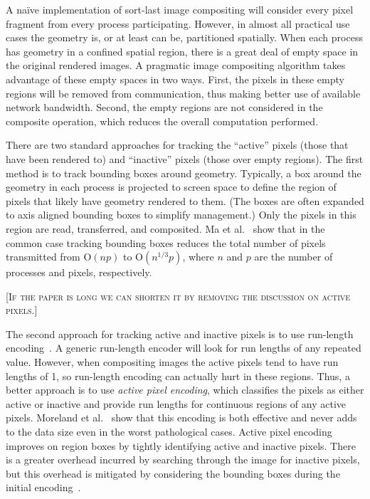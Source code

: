 \documentclass{vgtc}                          %
\newcommand*{\lcite}[1]{~\cite{#1}}
\newcommand*{\scite}[1]{~\cite{#1}}
\newcommand{\etal}{et al.}
\newcommand*{\keyterm}[1]{\emph{#1}}
\newcommand{\Oh}{\mathrm{O}}
\newcommand{\sticky}[1]{{\color{red}\textsc{[#1]}}}
\begin{document}
A na\"{i}ve implementation of sort-last image compositing will consider
every pixel fragment from every process participating.  However, in almost
all practical use cases the geometry is, or at least can be, partitioned
spatially.  When each process has geometry in a confined spatial region,
there is a great deal of empty space in the original rendered images.  A
pragmatic image compositing algorithm takes advantage of these empty spaces
in two ways.  First, the pixels in these empty regions will be removed from
communication, thus making better use of available network bandwidth.
Second, the empty regions are not considered in the composite operation,
which reduces the overall computation performed.

There are two standard approaches for tracking the ``active'' pixels (those
that have been rendered to) and ``inactive'' pixels (those over empty
regions).  The first method is to track bounding boxes around geometry.
Typically, a box around the geometry in each process is projected to screen
space to define the region of pixels that likely have geometry rendered to
them.  (The boxes are often expanded to axis aligned bounding boxes to
simplify management.)  Only the pixels in this region are read,
transferred, and composited.  Ma \etal\scite{BinarySwap2} show that in the
common case tracking bounding boxes reduces the total number of pixels
transmitted from $\Oh(n p)$ to $\Oh(n^{1/3} p)$, where $n$ and $p$ are the
number of processes and pixels, respectively.

\sticky{If the paper is long we can shorten it by removing the discussion
  on active pixels.}

The second approach for tracking active and inactive pixels is to use
run-length encoding\lcite{Ahrens1998}.  A generic run-length encoder
will look for run lengths of any repeated value.  However, when compositing
images the active pixels tend to have run lengths of 1, so run-length
encoding can actually hurt in these regions.  Thus, a better approach is to
use \keyterm{active pixel encoding}, which classifies the pixels as either
active or inactive and provide run lengths for continuous regions of any
active pixels.  Moreland \etal\scite{Moreland2001} show that this
encoding is both effective and never adds to the data size even in the
worst pathological cases.  Active pixel encoding improves on region boxes
by tightly identifying active and inactive pixels.  There is a greater
overhead incurred by searching through the image for inactive pixels, but
this overhead is mitigated by considering the bounding boxes during the
initial encoding\lcite{Yang1999}.
\end{document}
